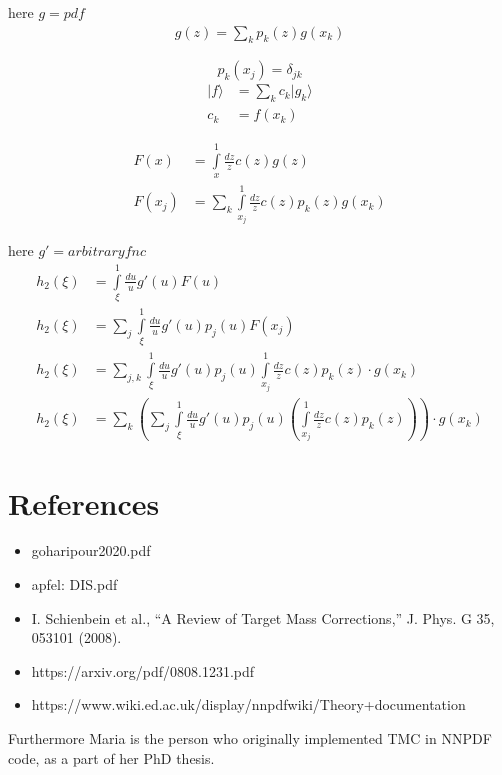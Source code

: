 \documentclass[
  english,		%
  a4paper,		%
  11pt,			%
  DIV=12,		%
  titlepage,
  toc=bibnumbered,
  parskip=full,  	%
  headings=normal,
  BCOR=12mm,
  numbers=noenddot
]{scrartcl}
\begin{document}
here $g = pdf$
\begin{align}
g(z) =  \sum\limits_k p_k(z) g(x_k)
\end{align}

\[ p_k(x_j) = \delta_{jk} \]
\[   \]
\begin{align}
|f\rangle  &= \sum_k c_k | g_k \rangle\\
c_k &= f(x_k)
\end{align}

\begin{align}
F(x) &= \int\limits_{x}^1 \frac{dz}{z} c(z) g(z)\\
F(x_j) &= \sum\limits_k \int\limits_{x_j}^1 \frac{dz}{z} c(z) p_k(z) g(x_k)
\end{align}

here $g' = arbitrary fnc$
\begin{align}
h_2(\xi) &= \int\limits_{\xi}^1 \frac{du}{u} g'(u) F(u)\\
h_2(\xi) &= \sum_j \int\limits_{\xi}^1 \frac{du}{u} g'(u) p_j(u) F(x_j)\\
h_2(\xi) &= \sum_{j,k} \int\limits_{\xi}^1 \frac{du}{u} g'(u) p_j(u) \int\limits_{x_j}^1 \frac{dz}{z} c(z) p_k(z) \cdot g(x_k)\\
h_2(\xi) &= \sum_{k} \left(\sum_j \int\limits_{\xi}^1 \frac{du}{u} g'(u) p_j(u) \left( \int\limits_{x_j}^1 \frac{dz}{z} c(z) p_k(z) \right)\right) \cdot g(x_k)
\end{align}

\section{References}
\begin{itemize}
  \item goharipour2020.pdf
  \item apfel: DIS.pdf
  \item  I. Schienbein et al., “A Review of Target Mass Corrections,” J. Phys. G 35, 053101 (2008).
  \item https://arxiv.org/pdf/0808.1231.pdf
  \item https://www.wiki.ed.ac.uk/display/nnpdfwiki/Theory+documentation
\end{itemize}

Furthermore Maria is the person who originally implemented TMC in NNPDF code, as a part of her PhD thesis.
\end{document}
